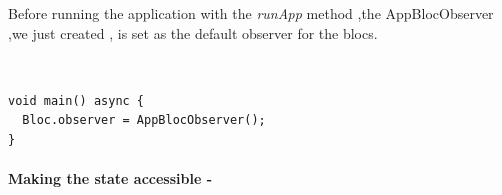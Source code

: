Before running the application with the \textit{runApp} method ,the AppBlocObserver ,we just created , is set as the default observer for the blocs.
\begin{code}
\mbox{}\\
 \mbox{}
\label{code:2.14}
\begin{verbatim}
void main() async {
  Bloc.observer = AppBlocObserver();
}
\end{verbatim}
\mbox{}
\end{code}
\paragraph{Making the state accessible - }
\label{subpar:todo_app_bloc_core_state}

